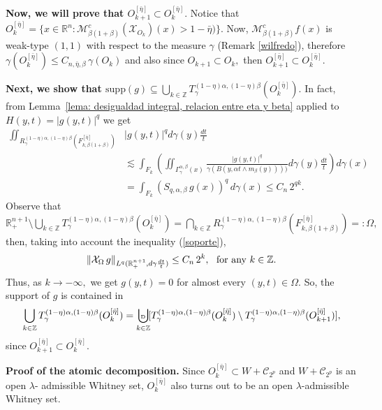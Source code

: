 \documentclass[leqno,11pt]{amsart}
\theoremstyle{plain}
\theoremstyle{remark}
\begin{document}
{{{{\bf Now, we will prove that $O_{k+1}^{[\bar{\eta}]}\subset O_k^{[\bar{\eta}]}.$}
Notice that $O_k^{[\bar{\eta}]}=\{x\in \mathbb{R}^n: \mathcal{M}^c_{\beta (1+\beta)}(\mathcal{X}_{O_k})(x)>1-\bar{\eta})\}.$ Now, $\mathcal{M}^c_{\beta (1+\beta)} f(x) $ is weak-type $(1,1)$  with respect to the measure $\gamma$ (Remark \ref{wilfredo}), therefore $\gamma(O_k^{[\bar{\eta}]})\le C_{n,\bar{\eta}, \beta}\, \gamma(O_k)$ and also since $O_{k+1}\subset O_k,$ then $O_{k+1}^{[\bar{\eta}]}\subset O_k^{[\bar{\eta}]}.$


{\bf Next, we show that $\text{supp}(g)\subseteq \bigcup_{k\in {\mathbb Z}}T^{(1-\eta)\alpha, (1-\eta)\beta}_\gamma (O_k^{[\bar{\eta}]}).$}
In fact, 
from Lemma~\ref{lema: desigualdad integral, relacion entre eta y beta} applied to $H(y,t)=|g(y,t)|^q$ we get 
\begin{align}\label{soporte}
    \iint_{R_\gamma^{(1-\eta)\alpha, (1-\eta)\beta}(F_{k,\beta(1+\beta)}^{[\bar{\eta}]})} & |g(y,t)|^q   d\gamma(y) \frac{dt}{t} \nonumber\\
    &\lesssim\int_{F_{k}} \left(\iint_{\Gamma_\gamma^{\alpha, \beta}(x)} \frac{|g(y,t)|^q}{\gamma(B(y,\alpha t\wedge m_\beta(y))))} d\gamma(y) \frac{dt}{t}\right) d\gamma(x)\\
    &=\int_{F_k} (S_{q,\alpha, \beta}\, g (x))^q \, d\gamma(x)\le C_n\, 2^{q k}.\nonumber
\end{align}
Observe that $\mathbb{R}^{n+1}_+\setminus \bigcup_{k\in {\mathbb Z}}T^{(1-\eta)\alpha, (1-\eta)\beta}_\gamma (O_k^{[\bar{\eta}]})=\bigcap_{k\in {\mathbb Z}} R_\gamma^{(1-\eta)\alpha, (1-\eta)\beta} (F_{k,\beta (1+\beta)}^{[\bar{\eta}]})=:\Omega,$ then, taking into account the inequality (\ref{soporte}), $$\|\mathcal{X}_\Omega\, g\|_{L^{q}(\mathbb{R}^{n+1}_+,d\gamma\frac{dt}{t})}\le C_n\, 2^k,\ \hbox{ for any } k\in {\mathbb Z}.$$ Thus, as $k\to -\infty,$ we get $g(y,t)=0$ for almost every $(y,t)\in \Omega.$ So, the support of $g$ is contained in $$\bigcup_{k\in {\mathbb Z}}T^{(1-\eta)\alpha, (1-\eta)\beta}_\gamma (O_k^{[\bar{\eta}]})=
{\bigcup_{k\in {\mathbb Z}}\!\!\!\!\!\!\!{\hbox{\tiny D}}} \; [T^{(1-\eta)\alpha, (1-\eta)\beta}_\gamma(O_k^{[\bar{\eta}]})\setminus T_\gamma^{(1-\eta)\alpha, (1-\eta)\beta}(O_{k+1}^{[\bar{\eta}]})],$$
since $O_{k+1}^{[\bar{\eta}]}\subset O_k^{[\bar{\eta}]}.$

{\bf Proof of the atomic decomposition.}
Since $O_k^{[\bar{\eta}]}\subset  W+\mathscr{C}_{2^p}$ and $W+\mathscr{C}_{2^p}$ is an open $\lambda$- admissible Whitney set, $O_k^{[\bar{\eta}]}$ also turns out to be an open $\lambda$-admissible Whitney set.

}}}
\end{document}
